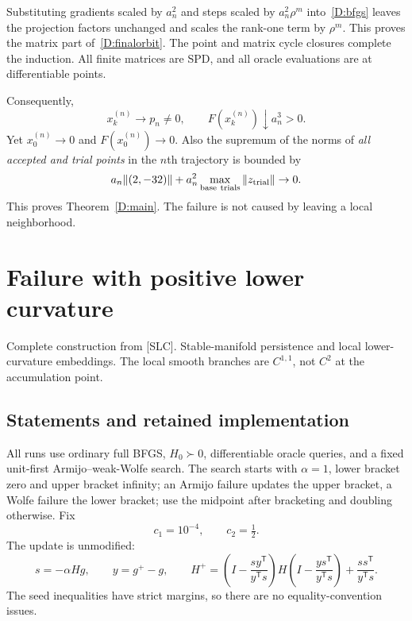 \documentclass[10pt,oneside,openany]{book}
\newcommand{\ModuleTag}{I}
\theoremstyle{remark}\newtheorem{remark}{Remark}[chapter]
\newcommand{\StartModule}[3]{\cleardoublepage\renewcommand{\ModuleTag}{#1}\chapter{#2}\label{#1:chapter}\begin{small}\color{Accent}#3\end{small}\par\vspace{3pt}{\color{RuleGray}\hrule}\vspace{9pt}}
\begin{document}
Substituting gradients scaled by $a_n^2$ and steps scaled by $a_n^2\rho^m$ into~\eqref{D:bfgs} leaves the projection factors unchanged and scales the rank-one term by $\rho^m$. This proves the matrix part of~\eqref{D:finalorbit}. The point and matrix cycle closures complete the induction. All finite matrices are SPD, and all oracle evaluations are at differentiable points.

Consequently,
\[
 x_k^{(n)}\to p_n\ne0,\qquad
 F(x_k^{(n)})\downarrow a_n^3>0.
\]
Yet $x_0^{(n)}\to0$ and $F(x_0^{(n)})\to0$. Also the supremum of the norms of \emph{all accepted and trial points} in the $n$th trajectory is bounded by
\[
 a_n\|(2,-32)\|+a_n^2\max_{\rm base\ trials}\|z_{\rm trial}\|\to0.
\]
This proves Theorem~\ref{D:main}. The failure is not caused by leaving a local neighborhood.


\endgroup


\StartModule{L}{Failure with positive lower curvature}{Complete construction from [SLC]. Stable-manifold persistence and local lower-curvature embeddings. The local smooth branches are $C^{1,1}$, not $C^2$ at the accumulation point.}

\begingroup
\providecommand{\R}{}
\renewcommand{\R}{\mathbb R}
\providecommand{\T}{}
\renewcommand{\T}{^{\mathsf T}}
\providecommand{\norm}{}
\renewcommand{\norm}[1]{\left\lVert#1\right\rVert}
\providecommand{\ip}{}
\renewcommand{\ip}[2]{\langle #1,#2\rangle}
\setcounter{section}{0}
\setcounter{theorem}{0}
\setcounter{lemma}{0}
\setcounter{corollary}{0}
\setcounter{proposition}{0}
\setcounter{remark}{0}
\setcounter{equation}{0}
\section{Statements and retained implementation}
All runs use ordinary full BFGS, $H_0\succ0$, differentiable oracle queries, and a fixed unit-first Armijo--weak-Wolfe search. The search starts with $\alpha=1$, lower bracket zero and upper bracket infinity; an Armijo failure updates the upper bracket, a Wolfe failure the lower bracket; use the midpoint after bracketing and doubling otherwise. Fix
\[
 c_1=10^{-4},\qquad c_2=\tfrac12.
\]
The update is unmodified:
\[
 s=-\alpha Hg,\qquad y=g^+-g,\qquad
 H^+=\left(I-\frac{sy\T}{y\T s}\right)H
 \left(I-\frac{ys\T}{y\T s}\right)+\frac{ss\T}{y\T s}.
\]
The seed inequalities have strict margins, so there are no equality-convention issues.
\end{document}
